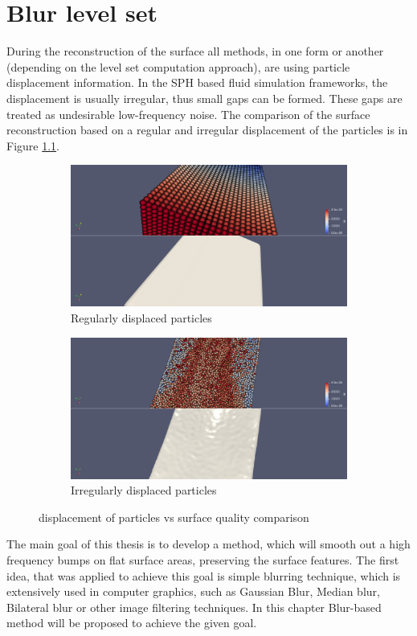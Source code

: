 \chapter{Blur level set}
During the reconstruction of the surface all methods, in one form or another (depending on the level set computation approach), are using particle displacement information. In the SPH based fluid simulation frameworks, the displacement is usually irregular, thus small gaps can be formed. These gaps are treated as undesirable low-frequency noise. The comparison of the surface reconstruction based on a regular and irregular displacement of the particles is in Figure \ref{fig:rec_vs_displacement}.
\begin{figure}[H]
	\begin{center}
		\begin{subfigure}[b]{0.6\textwidth}
			\includegraphics[width=\textwidth]{figures/FlatSurfaceWsParticleDisplacement.png}
			\caption{Regularly displaced particles}
		\end{subfigure}
		\begin{subfigure}[b]{0.6\textwidth}
			\includegraphics[width=\textwidth]{figures/NonFlatSurfaceWsParticleDisplacement.png}
			\caption{Irregularly displaced particles}
		\end{subfigure}
	\end{center}
	\caption{displacement of particles vs surface quality comparison}
	\label{fig:rec_vs_displacement}
\end{figure}
The main goal of this thesis is to develop a method, which will smooth out a high frequency bumps on flat surface areas, preserving the surface features. The first idea, that was applied to achieve this goal is simple blurring technique, which is extensively used in computer graphics, such as Gaussian Blur, Median blur, Bilateral blur or other image filtering techniques. In this chapter Blur-based method will be proposed to achieve the given goal. 
